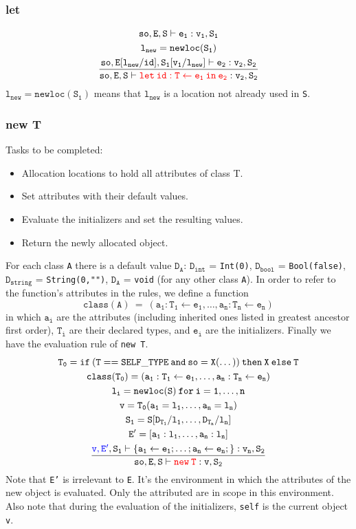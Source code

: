 \subsubsection{let}
\begin{gather*}
\mathtt{so,E,S\vdash e_1:v_1,S_1}\\
\mathtt{l_{new}=newloc(S_1)}\\
\mathtt{\frac{so,E[l_{new}/id],S_1[v_1/l_{new}]\vdash e_2:v_2,S_2}{so,E,S\vdash{\color{red}let\:id:T\leftarrow e_1\:in\:e_2}:v_2,S_2}}
\end{gather*}
$\mathtt{l_{new}=newloc(S_1)}$ means that $\mathtt{l_{new}}$ is a location not already used in \texttt{S}.
\subsubsection{new T}
Tasks to be completed:
\begin{itemize}
\item Allocation locations to hold all attributes of class T.
\item Set attributes with their default values.
\item Evaluate the initializers and set the resulting values.
\item Return the newly allocated object.
\end{itemize}
For each class \texttt{A} there is a default value $\mathtt{D_A}$: $\mathtt{D_{int}}$ = \texttt{Int(0)}, $\mathtt{D_{bool}}$ = \texttt{Bool(false)}, $\mathtt{D_{string}}$ = \texttt{String(0,"")}, $\mathtt{D_A}$ = \texttt{void} (for any other class \texttt{A}). In order to refer to the function's attributes in the rules, we define a function
\begin{equation*}
\mathtt{class(A)\:=\:(a_1:T_1\leftarrow e_1,\dots,a_n:T_n\leftarrow e_n)}
\end{equation*}
in which $\mathtt{a_i}$ are the attributes (including inherited ones listed in greatest ancestor first order), $\mathtt{T_i}$ are their declared types, and $\mathtt{e_i}$ are the initializers. Finally we have the evaluation rule of \texttt{new T}.
\begin{gather*}
\mathtt{T_0=if\:(T==SELF\_TYPE\:and\:so=X(\dots))\:then\:X\:else\:T}\\
\mathtt{class(T_0)=(a_1:T_1\leftarrow e_1,\dots,a_n:T_n\leftarrow e_n)}\\
\mathtt{l_i=newloc(S)\:for\:i=1,\dots,n}\\
\mathtt{v=T_0(a_1=l_1,\dots,a_n=l_n)}\\
\mathtt{S_1=S[D_{T_1}/l_1,\dots,D_{T_n}/l_n]}\\
\mathtt{E'=[a_1:l_1,\dots,a_n:l_n]}\\
\mathtt{\frac{\mathtt{{\color{blue}v,E'},S_1\vdash \{a_1\leftarrow e_1;\dots;a_n\leftarrow e_n;\}:v_n,S_2}
}{so,E,S\vdash{\color{red}new\:T}:v,S_2}}
\end{gather*}
Note that \texttt{E'} is irrelevant to \texttt{E}. It's the environment in which the attributes of the new object is evaluated. Only the attributed are in scope in this environment. Also note that during the evaluation of the initializers, \texttt{self} is the current object \texttt{v}.
